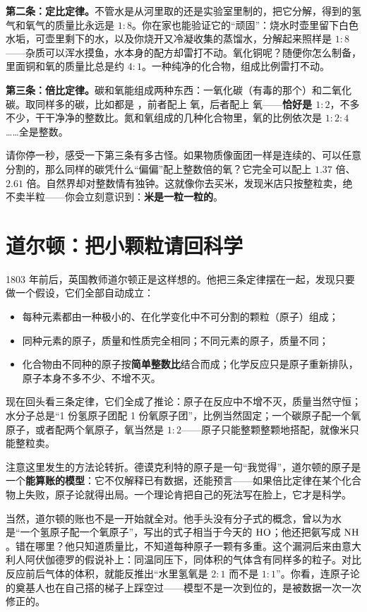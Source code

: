 \textbf{第二条：定比定律。}不管水是从河里取的还是实验室里制的，把它分解，得到的氢气和氧气的质量比永远是 $1:8$。你在家也能验证它的“顽固”：烧水时壶里留下白色水垢，可壶里剩下的水，以及你烧开又冷凝收集的蒸馏水，分解起来照样是 $1:8$——杂质可以浑水摸鱼，水本身的配方却雷打不动。氧化铜呢？随便你怎么制备，里面铜和氧的质量比总是约 $4:1$。一种纯净的化合物，组成比例雷打不动。

\textbf{第三条：倍比定律。}碳和氧能组成两种东西：一氧化碳（有毒的那个）和二氧化碳。取同样多的碳，比如都是 ，前者配上  氧，后者配上  氧——\textbf{恰好是 $1:2$}，不多不少，干干净净的整数比。氮和氧组成的几种化合物里，氧的比例依次是 $1:2:4$……全是整数。

请你停一秒，感受一下第三条有多古怪。如果物质像面团一样是连续的、可以任意分割的，那么同样的碳凭什么“偏偏”配上整数倍的氧？它完全可以配上 $1.37$ 倍、$2.61$ 倍。自然界却对整数情有独钟。这就像你去买米，发现米店只按整粒卖，绝不卖半粒——你会立刻意识到：\textbf{米是一粒一粒的}。

\section{道尔顿：把小颗粒请回科学}

1803 年前后，英国教师道尔顿正是这样想的。他把三条定律摆在一起，发现只要做一个假设，它们全部自动成立：

\begin{itemize}[itemsep=2pt]
\item 每种元素都由一种极小的、在化学变化中不可分割的颗粒（原子）组成；
\item 同种元素的原子，质量和性质完全相同；不同元素的原子，质量不同；
\item 化合物由不同种的原子按\textbf{简单整数比}结合而成；化学反应只是原子重新排队，原子本身不多不少、不增不灭。
\end{itemize}

现在回头看三条定律，它们全成了推论：原子在反应中不增不灭，质量当然守恒；水分子总是“1 份氢原子团配 1 份氧原子团”，比例当然固定；一个碳原子配一个氧原子，或者配两个氧原子，氧当然是 $1:2$——原子只能整颗整颗地搭配，就像米只能整粒卖。

注意这里发生的方法论转折。德谟克利特的原子是一句“我觉得”，道尔顿的原子是一个\textbf{能算账的模型}：它不仅解释已有数据，还能预言——如果倍比定律在某个化合物上失败，原子论就得出局。一个理论肯把自己的死法写在脸上，它才是科学。

当然，道尔顿的账也不是一开始就全对。他手头没有分子式的概念，曾以为水是“一个氢原子配一个氧原子”，写出的式子相当于今天的 $\mathrm{HO}$；他还把氨写成 $\mathrm{NH}$。错在哪里？他只知道质量比，不知道每种原子一颗有多重。这个漏洞后来由意大利人阿伏伽德罗的假说补上：同温同压下，同体积的气体含有同样多的粒子。对比反应前后气体的体积，就能反推出“水里氢氧是 $2:1$ 而不是 $1:1$”。你看，连原子论的奠基人也在自己搭的梯子上踩空过——模型不是一次到位的，是被数据一次一次修正的。

